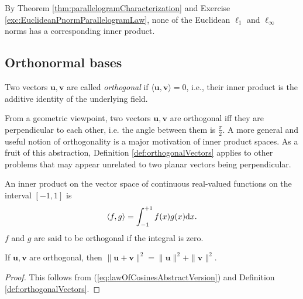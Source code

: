 \begin{exm}
  By Theorem \ref{thm:parallelogramCharacterization}
  and Exercise \ref{exc:EuclideanPnormParallelogramLaw},
  none of the Euclidean $\ell_1$ and $\ell_{\infty}$ norms
  has a corresponding inner product.
\end{exm}


\subsection{Orthonormal bases}
\label{sec:orthonormal-bases}

\begin{defn}
  \label{def:orthogonalVectors}
  Two vectors $\mathbf{u}, \mathbf{v}$ are called \emph{orthogonal}
  if $\langle \mathbf{u}, \mathbf{v}\rangle=0$,
  i.e., their inner product is the additive identity of the underlying
  field.
\end{defn}

\begin{rem}
  From a geometric viewpoint,
  two vectors $\mathbf{u}, \mathbf{v}$ are orthogonal iff
  they are perpendicular to each other,
  i.e. the angle between them is $\frac{\pi}{2}$. 
  A more general and useful notion of orthogonality
  is a major motivation of inner product spaces.
  As a fruit of this abstraction,
  Definition \ref{def:orthogonalVectors} applies to other problems
  that may appear unrelated to two planar vectors being perpendicular.
\end{rem}

\begin{exm}
  An inner product on the vector space of 
  continuous real-valued functions on the interval $[-1,1]$ is 
  \begin{equation*}
    \langle f, g \rangle = \int_{-1}^{+1} f(x) g(x)\mathrm{d} x.
  \end{equation*}
  $f$ and $g$ are said to be orthogonal
  if the integral is zero.
\end{exm}

\begin{thm}[Pythagorean]
  \label{thm:Pythagorean}
  If $\mathbf{u}, \mathbf{v}$ are orthogonal,
  then $\|\mathbf{u}+\mathbf{v}\|^2=\|\mathbf{u}\|^2+\|\mathbf{v}\|^2$.
\end{thm}
\begin{proof}
  This follows from (\ref{eq:lawOfCosinesAbstractVersion})
  and Definition \ref{def:orthogonalVectors}.
\end{proof}


